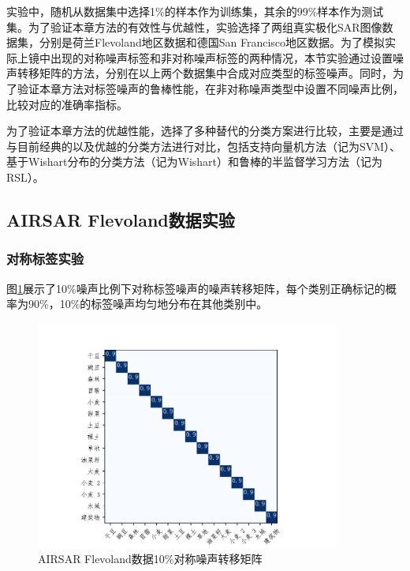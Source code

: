 实验中，随机从数据集中选择1\%的样本作为训练集，其余的99\%样本作为测试集。为了验证本章方法的有效性与优越性，实验选择了两组真实极化SAR图像数据集，分别是荷兰Flevoland地区数据和德国San Francisco地区数据。为了模拟实际上镜中出现的对称噪声标签和非对称噪声标签的两种情况，本节实验通过设置噪声转移矩阵的方法，分别在以上两个数据集中合成对应类型的标签噪声。同时，为了验证本章方法对标签噪声的鲁棒性能，在非对称噪声类型中设置不同噪声比例，比较对应的准确率指标。

为了验证本章方法的优越性能，选择了多种替代的分类方案进行比较，主要是通过与目前经典的以及优越的分类方法进行对比，包括支持向量机方法（记为SVM）\citing{}、基于Wishart分布的分类方法（记为Wishart）\citing{}和鲁棒的半监督学习方法（记为RSL）\citing{}。


\subsection{AIRSAR Flevoland数据实验}
\subsubsection{对称标签实验}
图\ref{fig:fle_noise_uniform}展示了10\%噪声比例下对称标签噪声的噪声转移矩阵，每个类别正确标记的概率为90\%，10\%的标签噪声均匀地分布在其他类别中。
\begin{figure}[h]
    \centering
    \includegraphics[width=10.04cm]{pic/chapter4/fle/noise_uniform.pdf}
    \caption{AIRSAR Flevoland数据10\%对称噪声转移矩阵}
    \label{fig:fle_noise_uniform}
\end{figure}

